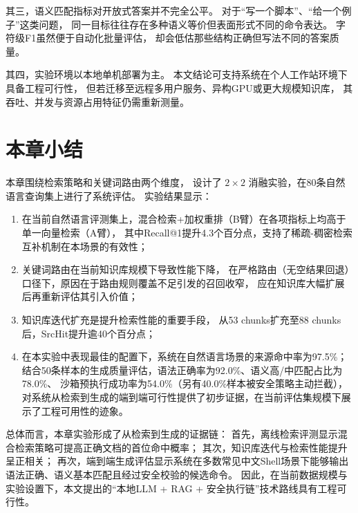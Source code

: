 其三，语义匹配指标对开放式答案并不完全公平。
对于``写一个脚本''、``给一个例子''这类问题，
同一目标往往存在多种语义等价但表面形式不同的命令表达。
字符级F1虽然便于自动化批量评估，
却会低估那些结构正确但写法不同的答案质量。

其四，实验环境以本地单机部署为主。
本文结论可支持系统在个人工作站环境下具备工程可行性，
但若迁移至远程多用户服务、异构GPU或更大规模知识库，
其吞吐、并发与资源占用特征仍需重新测量。

\section{本章小结}

本章围绕检索策略和关键词路由两个维度，
设计了 $2 \times 2$ 消融实验，在80条自然语言查询集上进行了系统评估。
实验结果显示：

\begin{enumerate}
        \item 在当前自然语言评测集上，混合检索+加权重排（B臂）在各项指标上均高于单一向量检索（A臂），
            其中Recall@1提升4.3个百分点，支持了稀疏-稠密检索互补机制在本场景的有效性；
    \item 关键词路由在当前知识库规模下导致性能下降，
        在严格路由（无空结果回退）口径下，原因在于路由规则覆盖不足引发的召回收窄，
          应在知识库大幅扩展后再重新评估其引入价值；
        \item 知识库迭代扩充是提升检索性能的重要手段，
            从53 chunks扩充至88 chunks后，SrcHit提升逾40个百分点；
        \item 在本实验中表现最佳的配置下，系统在自然语言场景的来源命中率为97.5\%；
            结合50条样本的生成质量评估，语法正确率为92.0\%、语义高/中匹配占比为78.0\%、
            沙箱预执行成功率为54.0\%（另有40.0\%样本被安全策略主动拦截），
            对系统从检索到生成的端到端可行性提供了初步证据，在当前评估集规模下展示了工程可用性的迹象。
\end{enumerate}

总体而言，本章实验形成了从检索到生成的证据链：
首先，离线检索评测显示混合检索策略可提高正确文档的首位命中概率；
其次，知识库迭代与检索性能提升呈正相关；
再次，端到端生成评估显示系统在多数常见中文Shell场景下能够输出语法正确、语义基本匹配且经过安全校验的候选命令。
因此，在当前数据规模与实验设置下，本文提出的``本地LLM + RAG + 安全执行链''技术路线具有工程可行性。


